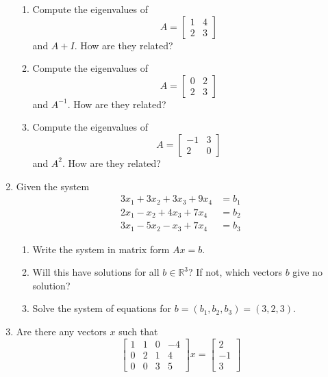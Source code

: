 \documentclass[14pt]{amsart}
\newcommand{\R}{\mathbb{R}}
\begin{document}
\begin{enumerate}
\begin{enumerate}
\item  Compute the eigenvalues of
%
\begin{equation*}
A = \begin{bmatrix}
1 & 4\\
2 & 3
\end{bmatrix}
\end{equation*} and $A + I$.  How are they related?

\item  Compute the eigenvalues of
%
\begin{equation*}
A = \begin{bmatrix}
0 & 2\\
2 & 3
\end{bmatrix}
\end{equation*} and $A^{-1}$.  How are they related?

\item  Compute the eigenvalues of
%
\begin{equation*}
A = \begin{bmatrix}
-1 & 3\\
2 & 0
\end{bmatrix}
\end{equation*} and $A^2$.  How are they related?

\end{enumerate}

\item  Given the system
%
\begin{equation*}
\begin{split}
3x_1 + 3x_2 + 3x_3 + 9x_4 &= b_1\\
2x_1 - x_2 + 4x_3 + 7x_4 &= b_2\\
3x_1 - 5x_2 - x_3 + 7 x_4 &= b_3
\end{split}
\end{equation*}

\begin{enumerate}

\item  Write the system in matrix form $Ax = b$.

\item  Will this have solutions for all $b \in \R^3$?  If not, which vectors $b$ give no solution?

\item  Solve the system of equations for $b = (b_1, b_2, b_3) = (3, 2, 3)$.

\end{enumerate}

\item  Are there any vectors $x$ such that
%
\begin{equation*}
\begin{bmatrix}
1 & 1 & 0 & -4\\
0 & 2 & 1 & 4\\
0 & 0 & 3 & 5
\end{bmatrix}x = \begin{bmatrix}
2\\
-1\\
3
\end{bmatrix}
\end{equation*}


\end{enumerate}
\end{document}
